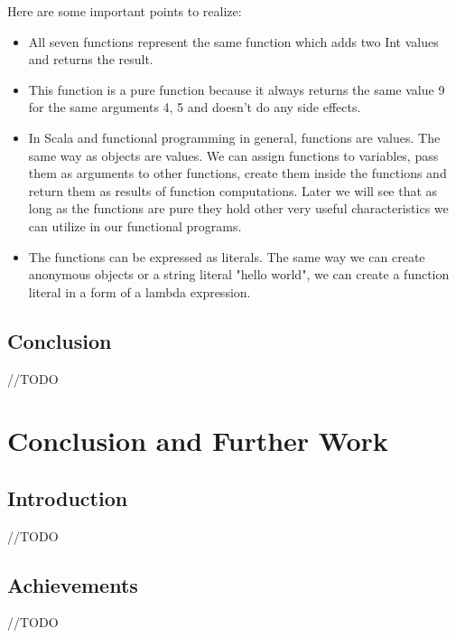 \documentclass[12pt,twoside,a4paper]{report}
\begin{document}
Here are some important points to realize:

\begin{itemize}\itemsep1pt \parskip0pt 
\item All seven functions represent the same function which adds two Int values and returns the result.
\item This function is a pure function because it always returns the same value 9 for the same arguments 4, 5 and doesn't do any side effects.
\item In Scala and functional programming in general, functions are values. The same way as objects are values. We can assign functions to variables, pass them as arguments to other functions, create them inside the functions and return them as results of function computations. Later we will see that as long as the functions are pure they hold other very useful characteristics we can utilize in our functional programs.
\item The functions can be expressed as literals. The same way we can create anonymous objects or a string literal "hello world", we can create a function literal in a form of a lambda expression.
\end{itemize}

\section{Conclusion}\label{6.10}
//TODO











\chapter{Conclusion and Further Work}\label{7}

\section{Introduction}\label{7.1}
//TODO

\section{Achievements}\label{7.2}
//TODO
\end{document}
